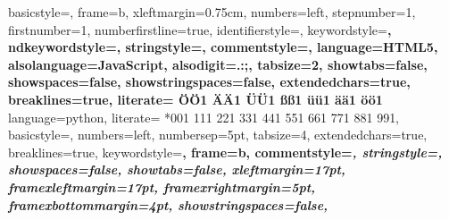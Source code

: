 \documentclass{book}
\begin{document}
 {%
  basicstyle={\footnotesize\ttfamily},   
  frame=b,
  xleftmargin={0.75cm},
  numbers=left,
  stepnumber=1,
  firstnumber=1,
  numberfirstline=true,	
  identifierstyle=\color{black},
  keywordstyle=\color{blue}\bfseries,
  ndkeywordstyle=\color{editorGreen}\bfseries,
  stringstyle=\color{editorOcher}\ttfamily,
  commentstyle=\color{brown}\ttfamily,
  language=HTML5,
  alsolanguage=JavaScript,
  alsodigit={.:;},	
  tabsize=2,
  showtabs=false,
  showspaces=false,
  showstringspaces=false,
  extendedchars=true,
  breaklines=true,
  literate=%
  {Ö}{{\"O}}1
  {Ä}{{\"A}}1
  {Ü}{{\"U}}1
  {ß}{{\ss}}1
  {ü}{{\"u}}1
  {ä}{{\"a}}1
  {ö}{{\"o}}1
}
%
 {%
language=python,
literate=%
*{0}{{{\color{lightred}0}}}1
{1}{{{\color{lightred}1}}}1
{2}{{{\color{lightred}2}}}1
{3}{{{\color{lightred}3}}}1
{4}{{{\color{lightred}4}}}1
{5}{{{\color{lightred}5}}}1
{6}{{{\color{lightred}6}}}1
{7}{{{\color{lightred}7}}}1
{8}{{{\color{lightred}8}}}1
{9}{{{\color{lightred}9}}}1,
basicstyle=\footnotesize\ttfamily, %
numbers=left,               %
numbersep=5pt,              %
tabsize=4,                  %
extendedchars=true,         %
breaklines=true,            %
keywordstyle=\color{blue}\bfseries,
frame=b,
commentstyle=\color{brown}\itshape,
stringstyle=\color{editorOcher}\ttfamily, %
showspaces=false,           %
showtabs=false,             %
xleftmargin=17pt,
framexleftmargin=17pt,
framexrightmargin=5pt,
framexbottommargin=4pt,
showstringspaces=false,      %
}%











\end{document}

